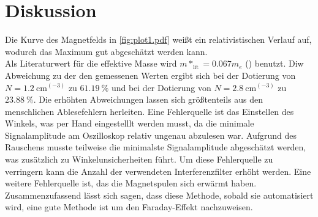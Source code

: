 \section{Diskussion}
\label{sec:Diskussion}
Die Kurve des Magnetfelds in \autoref{fig:plot1.pdf} weißt ein relativistischen Verlauf auf, wodurch das Maximum gut abgeschätzt werden kann.\\
Als Literaturwert für die effektive Masse wird $m*_{\text{lit}}= 0.067 m_e$ (\cite{effektiveMasseGaAs}) benutzt. Diw Abweichung zu der den gemessenen
Werten ergibt sich bei der Dotierung von $N = \qty{1.2}{\centi\meter^(-3)}$ zu $\qty{61.19}{\percent}$ und bei der Dotierung von $N = \qty{2.8}{\centi\meter^(-3)}$
zu $\qty{23.88}{\percent}$. Die erhöhten Abweichungen lassen sich größtenteils aus den menschlichen Ablesefehlern herleiten. 
Eine Fehlerquelle ist das Einstellen des Winkels, was per Hand eingestelllt werden musst, da die minimale Signalamplitude am Oszilloskop relativ ungenau
abzulesen war. Aufgrund des Rauschens musste teilweise die minimalste Signalamplitude abgeschätzt werden, was zusätzlich zu Winkelunsicherheiten 
führt. Um diese Fehlerquelle zu verringern kann die Anzahl der verwendeten Interferenzfilter erhöht werden. Eine weitere Fehlerquelle ist, das die Magnetspulen
sich erwärmt haben.\\
Zusammenzufassend lässt sich sagen, dass diese Methode, sobald sie automatisiert wird, eine gute Methode ist um den Faraday-Effekt nachzuweisen.


